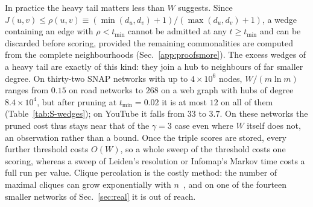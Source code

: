 In practice the heavy tail matters less than $W$ suggests. Since
$J(u,v)\le\rho(u,v)\equiv(\min(d_u,d_v)+1)/(\max(d_u,d_v)+1)$, a wedge containing an edge
with $\rho<t_{\min}$ cannot be admitted at any $t\ge t_{\min}$ and can be discarded
before scoring, provided the remaining commonalities are computed from the complete
neighbourhoods (Sec.~\ref{app:proofsmore}). The excess wedges of a heavy tail are exactly
of this kind: they join a hub to neighbours of far smaller degree. On thirty-two SNAP
networks with up to $4\times10^6$ nodes, $W/(m\ln m)$ ranges from $0.15$ on road networks
to $268$ on a web graph with hubs of degree $8.4\times10^4$, but after pruning at
$t_{\min}=0.02$ it is at most $12$ on all of them (Table~\ref{tab:S-wedges}); on YouTube
it falls from $33$ to $3.7$. On these networks the pruned cost thus stays near that of the
$\gamma=3$ case even where $W$ itself does not, an observation rather than a bound. Once the triple scores are stored, every further threshold costs
$O(W)$, so a whole sweep of the threshold costs one scoring, whereas a sweep of Leiden's
resolution or Infomap's Markov time costs a full run per value. Clique percolation is the
costly method: the number of maximal cliques can grow exponentially with
$n$~\cite{moon1965cliques}, and on one of the fourteen smaller networks of
Sec.~\ref{sec:real} it is out of reach.
